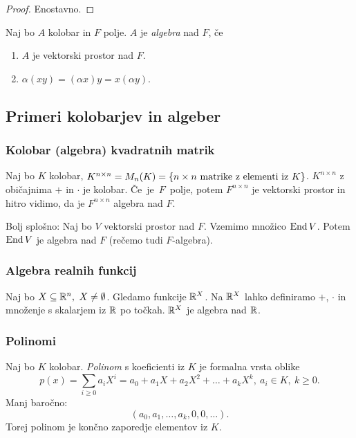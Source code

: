 \begin{proof}
    Enostavno.
\end{proof}

\begin{definicija}
    Naj bo $A$ kolobar in $F$ polje. $A$ je \emph{algebra} nad $F$, če 
    \begin{enumerate}
        \item $A$ je vektorski prostor nad $F$.
        \item $\alpha(xy) = (\alpha x)y = x(\alpha y)$.
    \end{enumerate}
\end{definicija}

\subsection{Primeri kolobarjev in algeber}
\subsubsection*{Kolobar (algebra) kvadratnih matrik}
Naj bo $K$ kolobar, $K^{n \times n} = M_n(K) = \left\{n \times n \text{ matrike z elementi iz } K\right\}$. $K^{n \times n}$ z običajnima $+$ in $\cdot$ je kolobar. Če~je~$F$~polje, potem $F^{n \times n}$ je vektorski prostor in hitro vidimo, da je $F^{n \times n}$ algebra nad $F$.

Bolj splošno: Naj bo $V$ vektorski prostor nad $F$. Vzemimo množico $\operatorname{End} V$. Potem $\operatorname{End} V$ je algebra nad $F$ (rečemo tudi $F$-algebra).

\subsubsection*{Algebra realnih funkcij}
Naj bo $X \subseteq \mathbb{R}^n, \ X \neq \emptyset$. Gledamo funkcije $\mathbb{R}^X$. Na $\mathbb{R}^X$ lahko definiramo $+$, $\cdot$ in množenje s skalarjem iz $\mathbb{R}$ po točkah. $\mathbb{R}^X$ je algebra nad $\mathbb{R}$.

\subsubsection*{Polinomi}
Naj bo $K$ kolobar. \emph{Polinom} s koeficienti iz $K$ je formalna vrsta oblike
$$p(x) = \sum_{i \geq 0} a_iX^i = a_0 + a_1X + a_2 X^2 + \ldots + a_k X^k, \ a_i \in K, \ k \geq 0.$$
Manj baročno:
$$(a_0, a_1, \ldots, a_k, 0, 0, \ldots).$$
Torej polinom je končno zaporedje elementov iz $K$.

